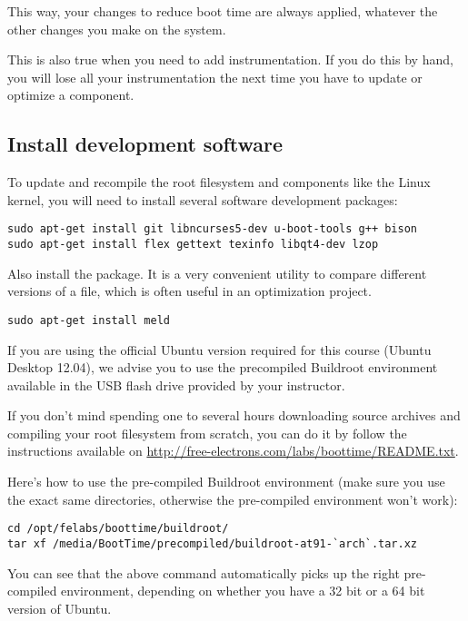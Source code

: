 This way, your changes to reduce boot time are always applied,
whatever the other changes you make on the system.

This is also true when you need to add instrumentation. If you do
this by hand, you will lose all your instrumentation the next
time you have to update or optimize a component.

\subsection{Install development software}

To update and recompile the root filesystem and
components like the Linux kernel, you will need to install several
software development packages:

\begin{verbatim}
sudo apt-get install git libncurses5-dev u-boot-tools g++ bison
sudo apt-get install flex gettext texinfo libqt4-dev lzop
\end{verbatim}

Also install the  package. It is a very
convenient utility to compare different versions of a file, which
is often useful in an optimization project.

\begin{verbatim}
sudo apt-get install meld
\end{verbatim}

If you are using the official Ubuntu version required for this course
(Ubuntu Desktop 12.04), we advise you to use the precompiled
Buildroot environment available in the USB flash drive provided by your
instructor.

If you don't mind spending one to several hours
downloading source archives and compiling your root filesystem from
scratch, you can do it by follow the instructions available on
\url{http://free-electrons.com/labs/boottime/README.txt}.

Here's how to use the pre-compiled Buildroot environment (make sure you
use the exact same directories, otherwise the pre-compiled environment
won't work):

\begin{verbatim}
cd /opt/felabs/boottime/buildroot/
tar xf /media/BootTime/precompiled/buildroot-at91-`arch`.tar.xz
\end{verbatim}

You can see that the above command automatically picks up the right
pre-compiled environment, depending on whether you have a 32 bit or
a 64 bit version of Ubuntu.

